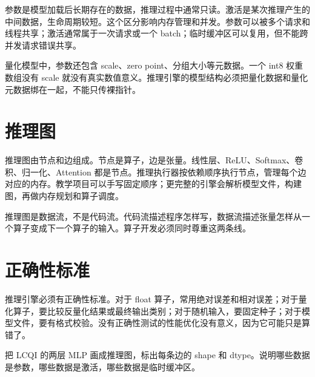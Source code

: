 参数是模型加载后长期存在的数据，推理过程中通常只读。激活是某次推理产生的中间数据，生命周期较短。这个区分影响内存管理和并发。参数可以被多个请求和线程共享；激活通常属于一次请求或一个 batch；临时缓冲区可以复用，但不能跨并发请求错误共享。

量化模型中，参数还包含 scale、zero point、分组大小等元数据。一个 int8 权重数组没有 scale 就没有真实数值意义。推理引擎的模型结构必须把量化数据和量化元数据绑在一起，不能只传裸指针。

\section{推理图}

推理图由节点和边组成。节点是算子，边是张量。线性层、ReLU、Softmax、卷积、归一化、Attention 都是节点。推理执行器按依赖顺序执行节点，管理每个边对应的内存。教学项目可以手写固定顺序；更完整的引擎会解析模型文件，构建图，再做内存规划和算子调度。

\begin{mentalmodel}
推理图是数据流，不是代码流。代码流描述程序怎样写，数据流描述张量怎样从一个算子变成下一个算子的输入。算子开发必须同时尊重这两条线。
\end{mentalmodel}

\section{正确性标准}

推理引擎必须有正确性标准。对于 float 算子，常用绝对误差和相对误差；对于量化算子，要比较反量化结果或最终输出类别；对于随机输入，要固定种子；对于模型文件，要有格式校验。没有正确性测试的性能优化没有意义，因为它可能只是算错了。

\begin{exercisebox}
把 LCQI 的两层 MLP 画成推理图，标出每条边的 shape 和 dtype。说明哪些数据是参数，哪些数据是激活，哪些数据是临时缓冲区。
\end{exercisebox}
